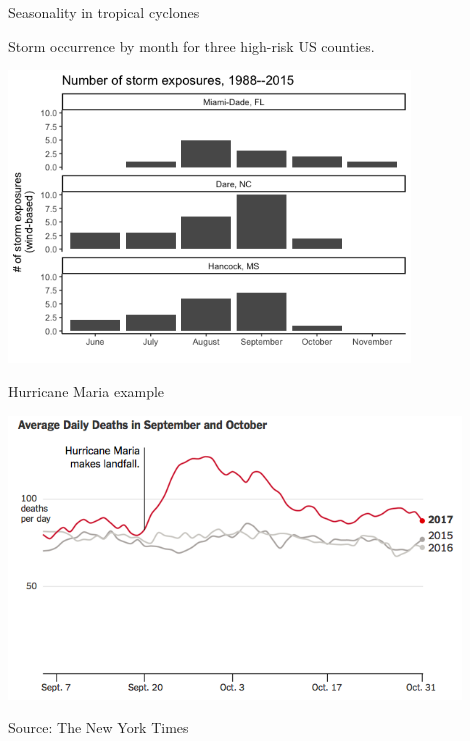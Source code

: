 \documentclass[ignorenonframetext,]{beamer}
\begin{document}
\begin{frame}{Seasonality in tropical cyclones}

Storm occurrence by month for three high-risk US counties.

\begin{center}\includegraphics[width=0.8\textwidth]{storm_seasonality} \end{center}

\end{frame}

\begin{frame}{Hurricane Maria example}

\begin{center}\includegraphics[width=0.9\textwidth]{maria_timeseries} \end{center}

\vspace{-0.2cm}

\footnotesize

Source: The New York Times

\end{frame}
\end{document}
